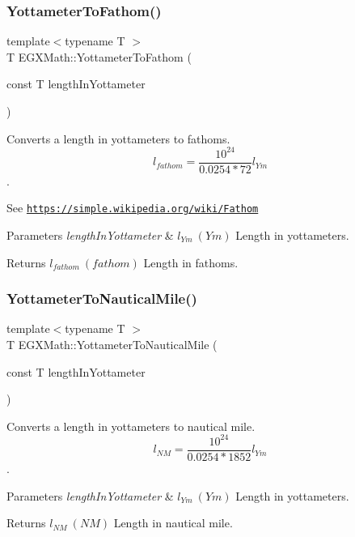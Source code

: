 \subsubsection{\texorpdfstring{Yottameter\+To\+Fathom()}{YottameterToFathom()}}
{\footnotesize\ttfamily template$<$typename T $>$ \\
T E\+G\+X\+Math\+::\+Yottameter\+To\+Fathom (\begin{DoxyParamCaption}\item[{const T}]{length\+In\+Yottameter }\end{DoxyParamCaption})}



Converts a length in yottameters to fathoms. \[ l_{fathom}= \frac{10^{24}}{0.0254 * 72} l_{Ym} \]. 

See \href{https://simple.wikipedia.org/wiki/Fathom}{\tt https\+://simple.\+wikipedia.\+org/wiki/\+Fathom} 
\begin{DoxyParams}{Parameters}
{\em length\+In\+Yottameter} & $ l_{Ym}\ (Ym)$ Length in yottameters. \\
\hline
\end{DoxyParams}
\begin{DoxyReturn}{Returns}
$ l_{fathom}\ (fathom)$ Length in fathoms. 
\end{DoxyReturn}
\mbox{\label{group___e_g_x_math-_conversions-_length_conversions-_s_i-_yottameter-_nautical_ga455b7f16dd9ff68f759f366def111300}} 
\subsubsection{\texorpdfstring{Yottameter\+To\+Nautical\+Mile()}{YottameterToNauticalMile()}}
{\footnotesize\ttfamily template$<$typename T $>$ \\
T E\+G\+X\+Math\+::\+Yottameter\+To\+Nautical\+Mile (\begin{DoxyParamCaption}\item[{const T}]{length\+In\+Yottameter }\end{DoxyParamCaption})}



Converts a length in yottameters to nautical mile. \[ l_{NM}= \frac{10^{24}}{0.0254 * 1852} l_{Ym} \]. 


\begin{DoxyParams}{Parameters}
{\em length\+In\+Yottameter} & $ l_{Ym}\ (Ym)$ Length in yottameters. \\
\hline
\end{DoxyParams}
\begin{DoxyReturn}{Returns}
$ l_{NM}\ (NM)$ Length in nautical mile. 
\end{DoxyReturn}
